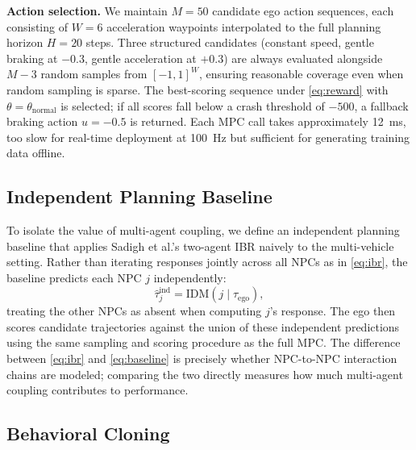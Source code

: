 \documentclass[conference]{IEEEtran}
\begin{document}
\textbf{Action selection.}
We maintain $M = 50$ candidate ego action sequences, each consisting of
$W = 6$ acceleration waypoints interpolated to the full planning horizon
$H = 20$ steps.
Three structured candidates (constant speed, gentle braking at $-0.3$,
gentle acceleration at $+0.3$) are always evaluated alongside $M - 3$
random samples from $[-1, 1]^W$, ensuring reasonable coverage even when
random sampling is sparse.
The best-scoring sequence under \eqref{eq:reward} with $\theta = \theta_{\text{normal}}$
is selected; if all scores fall below a crash threshold of $-500$, a
fallback braking action $u = -0.5$ is returned.
Each MPC call takes approximately 12~ms, too slow for real-time deployment
at 100~Hz but sufficient for generating training data offline.

\subsection{Independent Planning Baseline}

To isolate the value of multi-agent coupling, we define an independent
planning baseline that applies Sadigh et al.'s two-agent IBR naively to
the multi-vehicle setting.
Rather than iterating responses jointly across all NPCs as in
\eqref{eq:ibr}, the baseline predicts each NPC $j$ independently:
\begin{equation}
  \hat{\tau}_j^{\text{ind}} = \text{IDM}\!\left(j \;\Big|\; \tau_{\text{ego}}\right),
  \label{eq:baseline}
\end{equation}
treating the other NPCs as absent when computing $j$'s response.
The ego then scores candidate trajectories against the union of these
independent predictions using the same sampling and scoring procedure as
the full MPC.
The difference between \eqref{eq:ibr} and \eqref{eq:baseline} is precisely
whether NPC-to-NPC interaction chains are modeled; comparing the two
directly measures how much multi-agent coupling contributes to performance.

\subsection{Behavioral Cloning}
\end{document}
